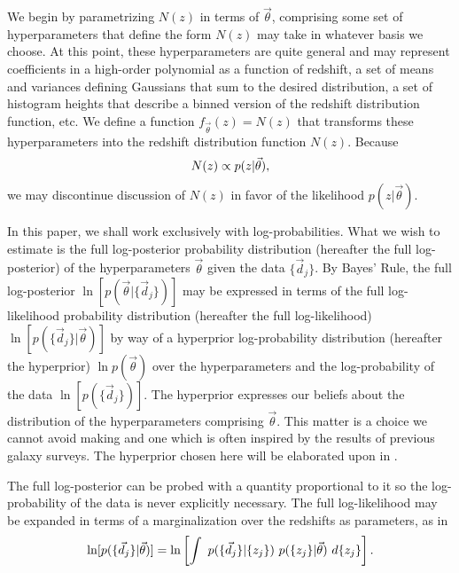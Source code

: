 We begin by parametrizing $N(z)$ in terms of $\vec{\theta}$, comprising some set of hyperparameters that define the form $N(z)$ may take in whatever basis we choose.  
At this point, these hyperparameters are quite general and may represent coefficients in a high-order polynomial as a function of redshift, a set of means and variances defining Gaussians that sum to the desired distribution, a set of histogram heights that describe a binned version of the redshift distribution function, etc.  
We define a function $f_{\vec{\theta}}(z)=N(z)$ that transforms these hyperparameters into the redshift distribution function $N(z)$.  
Because 
\begin{equation}
\eqlabel{eq:definition}
N(z) \propto p(z \gvn \vec{\theta}),
\end{equation}
we may discontinue discussion of $N(z)$ in favor of the likelihood $p(z|\vec{\theta})$.

In this paper, we shall work exclusively with log-probabilities.  
What we wish to estimate is the full log-posterior probability distribution (hereafter the full log-posterior) of the hyperparameters $\vec{\theta}$ given the data $\{\vec{d}_{j}\}$.  
By Bayes' Rule, the full log-posterior $\ln[p(\vec{\theta}|\{\vec{d}_{j}\})]$ may be expressed in terms of the full log-likelihood probability distribution (hereafter the full log-likelihood) $\ln[p(\{\vec{d}_{j}\}|\vec{\theta})]$ by way of a hyperprior log-probability distribution (hereafter the hyperprior) $\ln p(\vec{\theta})$ over the hyperparameters and the log-probability of the data $\ln[p(\{\vec{d}_{j}\})]$.  
The hyperprior expresses our beliefs about the distribution of the hyperparameters comprising $\vec{\theta}$.  
This matter is a choice we cannot avoid making and one which is often inspired by the results of previous galaxy surveys.  
The hyperprior chosen here will be elaborated upon in .

The full log-posterior can be probed with a quantity proportional to it so the log-probability of the data is never explicitly necessary.  
The full log-likelihood may be expanded in terms of a marginalization over the redshifts as parameters, as in 
\begin{equation}
\eqlabel{eq:marginalize}
\ln[p(\{\vec{d}_{j}\}|\vec{\theta})] = \ln\left[\int\ p(\{\vec{d}_{j}\}|\{z_{j}\})\ p(\{z_{j}\}|\vec{\theta})\ d\{z_{j}\}\right].
\end{equation}

